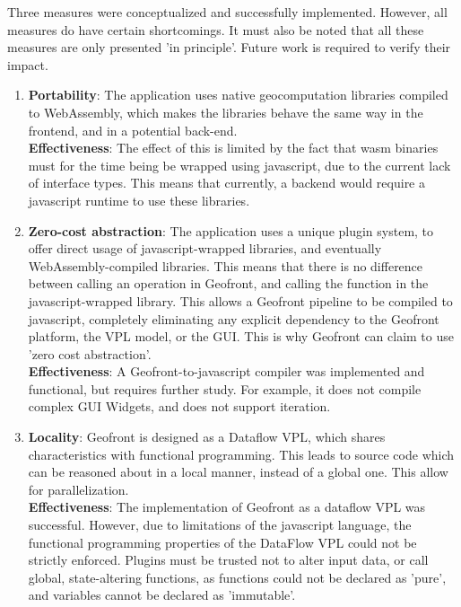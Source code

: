Three measures were conceptualized and successfully implemented. 
However, all measures do have certain shortcomings. 
It must also be noted that all these measures are only presented 'in principle'.
Future work is required to verify their impact.

\begin{enumerate}
  \item \textbf{Portability}: The application uses native geocomputation libraries compiled to WebAssembly, 
  which makes the libraries behave the same way in the frontend, and in a potential back-end. \\
  \textbf{Effectiveness}: The effect of this is limited by the fact that \ac{wasm} binaries must for the time being be wrapped using javascript, due to the current lack of interface types. 
  This means that currently, a backend would require a javascript runtime to use these libraries.

  \item \textbf{Zero-cost abstraction}: The application uses a unique plugin system, to offer direct usage of javascript-wrapped libraries, and eventually WebAssembly-compiled libraries.
  This means that there is no difference between calling an operation in Geofront, and calling the function in the javascript-wrapped library.
  This allows a Geofront pipeline to be compiled to javascript, completely eliminating any explicit dependency to the 
  Geofront platform, the VPL model, or the \ac{GUI}.
  This is why Geofront can claim to use 'zero cost abstraction'. \\
  \textbf{Effectiveness}: A Geofront-to-javascript compiler was implemented and functional, but requires further study. 
  For example, it does not compile complex \ac{GUI} Widgets, and does not support iteration.
  
  \item \textbf{Locality}: Geofront is designed as a Dataflow VPL, which shares characteristics with functional programming. This leads to source code which can be reasoned about in a local manner, instead of a global one. This allow for parallelization. \\
  \textbf{Effectiveness}: The implementation of Geofront as a dataflow VPL was successful. However, due to limitations of the javascript language, the functional programming properties of the DataFlow VPL could not be strictly enforced. 
  Plugins must be trusted not to alter input data, or call global, state-altering functions, as functions could not be declared as 'pure', and variables cannot be declared as 'immutable'.

\end{enumerate}

